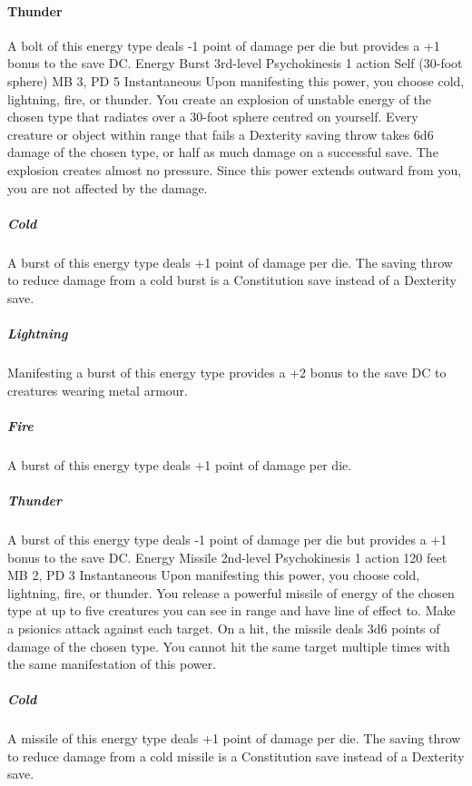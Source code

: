 \paragraph{Thunder} A bolt of this energy type deals -1 point
of damage per die but provides a +1 bonus to the save DC.
\DndPowerHeader%
    {Energy Burst\label{pwr:energy_burst}}
    {3rd-level Psychokinesis}
    {1 action}
    {Self (30-foot sphere)}
    {MB 3, PD 5}
    {Instantaneous}
Upon manifesting this power, you choose cold,
lightning, fire, or thunder. You create an explosion of unstable
energy of the chosen type that radiates over a 30-foot sphere
centred on yourself. Every creature or object within range
that fails a Dexterity saving throw takes 6d6 damage of the
chosen type, or half as much damage on a successful save.
The explosion creates almost no pressure. Since this power
extends outward from you, you are not affected by the damage.

\subparagraph{Cold} A burst of this energy type deals +1 point
of damage per die. The saving throw to reduce damage from
a cold burst is a Constitution save instead of a Dexterity
save.

\subparagraph{Lightning} Manifesting a burst of this energy
type provides a +2 bonus to the save DC to creatures wearing
metal armour.

\subparagraph{Fire} A burst of this energy type deals +1 point
of damage per die.

\subparagraph{Thunder} A burst of this energy type deals -1
point of damage per die but provides a +1 bonus to the save
DC.
\DndPowerHeader%
    {Energy Missile\label{pwr:energy_missile}}
    {2nd-level Psychokinesis}
    {1 action}
    {120 feet}
    {MB 2, PD 3}
    {Instantaneous}
Upon manifesting this power, you choose cold,
lightning, fire, or thunder. You release a powerful missile
of energy of the chosen type at up to five creatures you can
see in range and have line of effect to. Make a psionics attack
against each target. On a hit, the missile deals 3d6 points
of damage of the chosen type. You cannot hit the same target
multiple times with the same manifestation of this power.

\subparagraph{Cold} A missile of this energy type deals +1
point of damage per die. The saving throw to reduce damage
from a cold missile is a Constitution save instead of a Dexterity
save.

